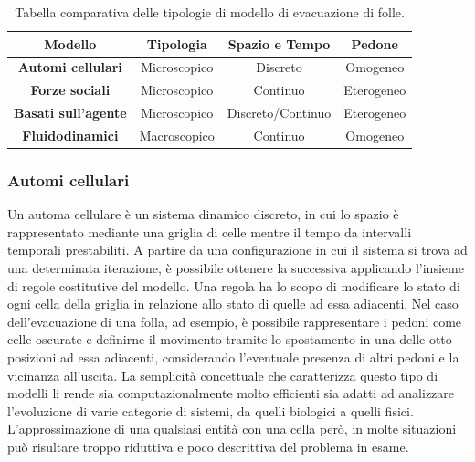 \begin{table}
\centering
\renewcommand{\arraystretch}{1.5}
\begin{tabular}{|c|c|c|c|}
\hline
\textbf{Modello}            & \textbf{Tipologia} & \textbf{Spazio e Tempo} & \textbf{Pedone} \\ \hline
\textbf{Automi cellulari}   & Microscopico       & Discreto                & Omogeneo        \\ \hline
\textbf{Forze sociali}      & Microscopico       & Continuo                & Eterogeneo      \\ \hline
\textbf{Basati sull'agente} & Microscopico       & Discreto/Continuo       & Eterogeneo      \\ \hline
\textbf{Fluidodinamici}     & Macroscopico       & Continuo                & Omogeneo        \\ \hline
\end{tabular}
\caption{Tabella comparativa delle tipologie di modello di evacuazione di folle.}
\label{table:models-comparison}
\end{table}

\subsubsection{Automi cellulari}
Un automa cellulare è un sistema dinamico discreto, in cui lo spazio è rappresentato mediante una griglia di celle mentre il tempo da intervalli temporali prestabiliti. \newline
A partire da una configurazione in cui il sistema si trova ad una determinata iterazione, è possibile ottenere la successiva applicando l'insieme di regole costitutive del modello. Una regola ha lo scopo di modificare lo stato di ogni cella della griglia in relazione allo stato di quelle ad essa adiacenti. \newline
Nel caso dell'evacuazione di una folla, ad esempio, è possibile rappresentare i pedoni come celle oscurate e definirne il movimento tramite lo spostamento in una delle otto posizioni ad essa adiacenti, considerando l'eventuale presenza di altri pedoni e la vicinanza all'uscita. \newline
La semplicità concettuale che caratterizza questo tipo di modelli li rende sia computazionalmente molto efficienti sia adatti ad analizzare l'evoluzione di varie categorie di sistemi, da quelli biologici a quelli fisici. \newline
L'approssimazione di una qualsiasi entità con una cella però, in molte situazioni può risultare troppo riduttiva e poco descrittiva del problema in esame.

